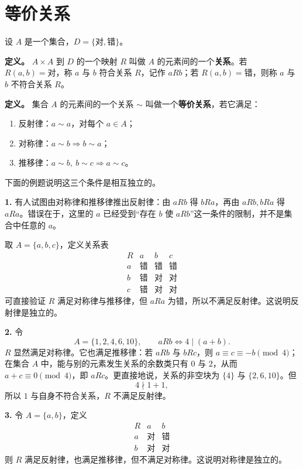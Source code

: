 \section{等价关系}

设 $A$ 是一个集合，$D=\{\text{对},\text{错}\}$。

\textbf{定义。} $A\times A$ 到 $D$ 的一个映射 $R$ 叫做 $A$ 的元素间的一个\textbf{关系}。若 $R(a,b)=\text{对}$，称 $a$ 与 $b$ 符合关系 $R$，记作 $aRb$；若 $R(a,b)=\text{错}$，则称 $a$ 与 $b$ 不符合关系 $R$。

\textbf{定义。} 集合 $A$ 的元素间的一个关系 $\sim$ 叫做一个\textbf{等价关系}，若它满足：
\begin{enumerate}[label=\Roman*.,leftmargin=3em]
\item 反射律：$a\sim a$，对每个 $a\in A$；
\item 对称律：$a\sim b\Longrightarrow b\sim a$；
\item 推移律：$a\sim b,\ b\sim c\Longrightarrow a\sim c$。
\end{enumerate}
下面的例题说明这三个条件是相互独立的。

\textbf{1.} 有人试图由对称律和推移律推出反射律：由 $aRb$ 得 $bRa$，再由 $aRb,bRa$ 得 $aRa$。错误在于，这里的 $a$ 已经受到“存在 $b$ 使 $aRb$”这一条件的限制，并不是集合中任意的 $a$。

取 $A=\{a,b,c\}$，定义关系表
\[
\begin{array}{c|ccc}
R&a&b&c\\\hline
 a&\text{错}&\text{错}&\text{错}\\
 b&\text{错}&\text{对}&\text{对}\\
 c&\text{错}&\text{对}&\text{对}
\end{array}
\]
可直接验证 $R$ 满足对称律与推移律，但 $aRa$ 为错，所以不满足反射律。这说明反射律是独立的。

\textbf{2.} 令
\[
A=\{1,2,4,6,10\},
\qquad
aRb\Longleftrightarrow4\mid(a+b).
\]
$R$ 显然满足对称律。它也满足推移律：若 $aRb$ 与 $bRc$，则 $a\equiv c\equiv-b\pmod4$；在集合 $A$ 中，能与别的元素发生关系的余数类只有 $0$ 与 $2$，从而 $a+c\equiv0\pmod4$，即 $aRc$。更直接地说，关系的非空块为 $\{4\}$ 与 $\{2,6,10\}$。但
\[
4\nmid1+1,
\]
所以 $1$ 与自身不符合关系，$R$ 不满足反射律。

\textbf{3.} 令 $A=\{a,b\}$，定义
\[
\begin{array}{c|cc}
R&a&b\\\hline
 a&\text{对}&\text{错}\\
 b&\text{对}&\text{对}
\end{array}
\]
则 $R$ 满足反射律，也满足推移律，但不满足对称律。这说明对称律是独立的。

